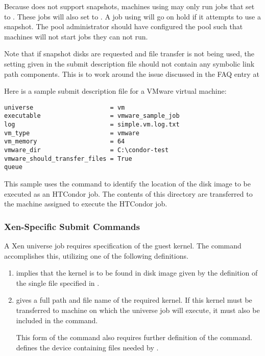 Because  does not support snapshots, 
machines using  may only run  jobs
that set  to .
These jobs will also set
 to .
A job using  will go on hold if it attempts
to use a snapshot.
The pool administrator should have configured the pool
such that machines will not start jobs they can not run.

Note that if snapshot disks are requested and file transfer is not
being used, the  setting given in 
the submit description file
should not contain any symbolic link path components.
This is to work around the issue discussed
in the FAQ entry at 

Here is a sample submit description file for a VMware virtual machine:
\begin{verbatim}
universe                     = vm
executable                   = vmware_sample_job
log                          = simple.vm.log.txt
vm_type                      = vmware
vm_memory                    = 64
vmware_dir                   = C:\condor-test
vmware_should_transfer_files = True
queue
\end{verbatim}
This sample uses the  command to identify
the location of the disk image to be executed as an HTCondor job.
The contents of this directory are transferred to the machine assigned
to execute the HTCondor job.

\subsubsection{\label{sec:vm-Xensubmitfile}Xen-Specific Submit Commands}

A Xen  universe job requires specification of the
guest kernel. 
The  command accomplishes this, 
utilizing one of the following definitions.
\begin{enumerate}
\item {} implies that the kernel
  is to be found in disk image given by the definition of the single file
  specified in . 

\item {} gives a full path and
  file name of the required kernel.  If this kernel must be transferred
  to machine on which the  universe job will execute,
  it must also be included in the  command. 

  This form of the  command also requires further
  definition of the  command.
   defines the device containing files needed by
  .

\end{enumerate}

